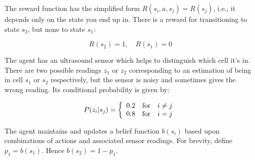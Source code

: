 \documentclass[12pt]{article}
\begin{document}
\noindent
The reward function has the simplified form $R(s_i,a,s_j) = R(s_j)$,
i.e., it depends only on the state you end up in.  There is a reward
for transitioning to state $s_2$, but none to state $s_1$:

$$R(s_2) = 1, \quad R(s_1) = 0$$

\noindent
The agent has an ultrasound sensor which helps to distinguish which
cell it's in.  There are two possible readings $z_1$ or $z_2$
corresponding to an estimation of being in cell $s_1$ or $s_2$
respectively, but the sensor is noisy and sometimes gives the wrong
reading.  Its conditional probability is given by:

$$P(z_i | s_j) = \left\{ \begin{array}{lll}
                                   0.2 & \hbox{for} & i\neq j \\
                                   0.8 & \hbox{for} & i = j
                            \end{array}
                    \right.$$

\noindent
The agent maintains and updates a belief function $b(s_i)$ based upon
combinations of actions and associated sensor readings.  For brevity,
define $p_1 = b(s_1)$.  Hence $b(s_2) = 1 - p_1$.
\end{document}
